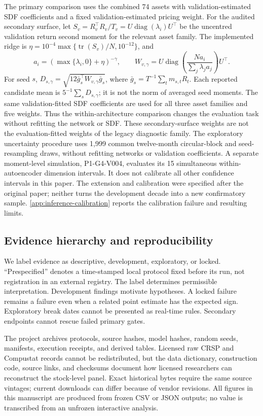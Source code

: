 The primary comparison uses the combined 74 assets with validation-estimated SDF coefficients and a fixed validation-estimated pricing weight.
For the audited secondary surface, let $S_v=R_v^{\top}R_v/T_v=U\operatorname{diag}(\lambda_i)U^{\top}$ be the uncentred validation return second moment for the relevant asset family. The implemented ridge is $\eta=10^{-4}\max\{\operatorname{tr}(S_v)/N,10^{-12}\}$, and
\begin{equation}
 a_i=(\max\{\lambda_i,0\}+\eta)^{-\gamma},\qquad
 W_{v,\gamma}=U\operatorname{diag}\!\left(\frac{N a_i}{\sum_j\lambda_j a_j}\right)U^{\top}.
\end{equation}
For seed $s$, $D_{s,\gamma}=\sqrt{12\bar g_s^{\top}W_{v,\gamma}\bar g_s}$, where $\bar g_s=T^{-1}\sum_t m_{s,t}R_t$. Each reported candidate mean is $5^{-1}\sum_s D_{s,\gamma}$; it is not the norm of averaged seed moments. The same validation-fitted SDF coefficients are used for all three asset families and five weights. Thus the within-architecture comparison changes the evaluation task without refitting the network or SDF. These secondary-surface weights are not the evaluation-fitted weights of the legacy diagnostic family.
 The exploratory uncertainty procedure uses 1,999 common twelve-month circular-block and seed-resampling draws, without refitting networks or validation coefficients. A separate moment-level simulation, P1-G4-V004, evaluates its 15 simultaneous within-autoencoder dimension intervals. It does not calibrate all other confidence intervals in this paper. The extension and calibration were specified after the original paper; neither turns the development decade into a new confirmatory sample. \ref{app:inference-calibration} reports the calibration failure and resulting limits.

\subsection{Evidence hierarchy and reproducibility}

We label evidence as descriptive, development, exploratory, or locked. ``Prespecified'' denotes a time-stamped local protocol fixed before its run, not registration in an external registry. The label determines permissible interpretation. Development findings motivate hypotheses. A locked failure remains a failure even when a related point estimate has the expected sign. Exploratory break dates cannot be presented as real-time rules. Secondary endpoints cannot rescue failed primary gates.

The project archives protocols, source hashes, model hashes, random seeds, manifests, execution receipts, and derived tables. Licensed raw CRSP and Compustat records cannot be redistributed, but the data dictionary, construction code, source links, and checksums document how licensed researchers can reconstruct the stock-level panel. Exact historical bytes require the same source vintages; current downloads can differ because of vendor revisions. All figures in this manuscript are produced from frozen CSV or JSON outputs; no value is transcribed from an unfrozen interactive analysis.
